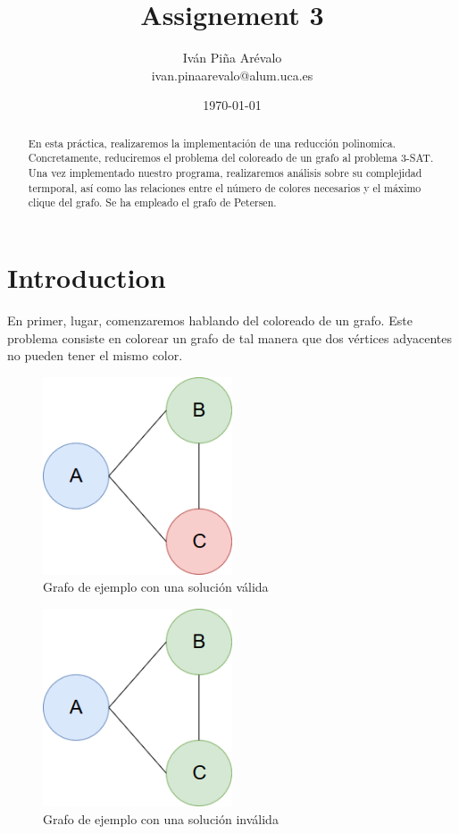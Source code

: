 \documentclass{article}
\title{Assignement 3}
\author{Iván Piña Arévalo \\ ivan.pinaarevalo@alum.uca.es}
\date{\today}
\begin{document}
\maketitle

\newpage
\begin{abstract}
    En esta práctica, realizaremos la implementación de una reducción polinomica. 
    Concretamente, reduciremos el problema del coloreado de un grafo al problema
    3-SAT. Una vez implementado nuestro programa, realizaremos análisis sobre su 
    complejidad termporal, así como las relaciones entre el número de colores 
    necesarios y el máximo clique del grafo. Se ha empleado el grafo de Petersen.
\end{abstract}

\newpage

\section{Introduction}
    En primer, lugar, comenzaremos hablando del coloreado de un grafo. Este problema
    consiste en colorear un grafo de tal manera que dos vértices adyacentes no pueden 
    tener el mismo color. 
    \begin{figure}[H]
        \centering
        \includegraphics[width=0.5\textwidth]{pictures/ejemplo.png}
        \caption{Grafo de ejemplo con una solución válida}
    \end{figure}
	
    \begin{figure}[H]
        \centering
        \includegraphics[width=0.5\textwidth]{pictures/ejemplobad.png}
        \caption{Grafo de ejemplo con una solución inválida}
    \end{figure}
\end{document}
